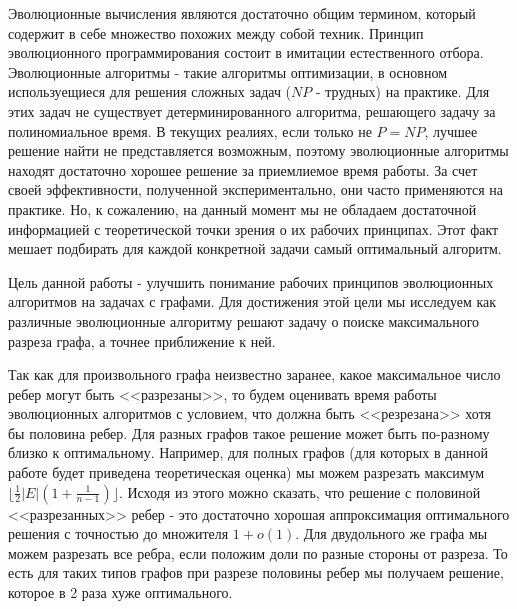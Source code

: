 \documentclass[times]{itmo-student-thesis}
\begin{document}

\tableofcontents

\startprefacepage
Эволюционные вычисления являются достаточно общим термином, который содержит в себе множество похожих между собой техник.
Принцип эволюционного программирования состоит в имитации естественного отбора.
Эволюционные алгоритмы - такие алгоритмы оптимизации, в основном используещиеся для решения сложных задач ($NP$ - трудных) на практике.
Для этих задач не существует детерминированного алгоритма, решающего задачу за полиномиальное время.
В текущих реалиях, если только не $P = NP$, лучшее решение найти не представляется возможным, поэтому эволюционные алгоритмы находят достаточно хорошее решение за приемлиемое время работы.
За счет своей эффективности, полученной экспериментально, они часто применяются на практике.
Но, к сожалению, на данный момент мы не обладаем достаточной информацией с теоретической точки зрения о их рабочих принципах. Этот факт мешает подбирать для каждой конкретной задачи самый оптимальный алгоритм.

Цель данной работы - улучшить понимание рабочих принципов эволюционных алгоритмов на задачах с графами.
Для достижения этой цели мы исследуем как различные эволюционные алгоритму решают задачу о поиске максимального разреза графа, а точнее приближение к ней.

Так как для произвольного графа неизвестно заранее, какое максимальное число ребер могут быть <<разрезаны>>, то будем оценивать время работы эволюционных алгоритмов с условием, что должна быть <<резрезана>> хотя бы половина ребер.
Для разных графов такое решение может быть по-разному близко к оптимальному.
Например, для полных графов (для которых в данной работе будет приведена теоретическая оценка) мы можем разрезать максимум $\lfloor\frac{1}{2} |E| (1 + \frac{1}{n-1})\rfloor$.
Исходя из этого можно сказать, что решение с половиной <<разрезанных>> ребер - это достаточно хорошая аппроксимация оптимального решения с точностью до множителя $1 + o(1)$.
Для двудольного же графа мы можем разрезать все ребра, если положим доли по разные стороны от разреза.
То есть для таких типов графов при разрезе половины ребер мы получаем решение, которое в 2 раза хуже оптимального.
\end{document}
